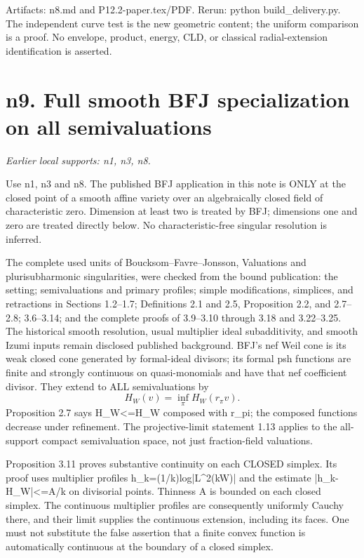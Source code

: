 \documentclass[11pt]{article}
\begin{document}
Artifacts: n8.md and P12.2-paper.tex/PDF. Rerun: python build\_delivery.py. The independent curve test is the new geometric content; the uniform comparison is a proof. No envelope, product, energy, CLD, or classical radial-extension identification is asserted.

\section{n9. Full smooth BFJ specialization on all semivaluations}
\textit{Earlier local supports: n1, n3, n8.}

Use n1, n3 and n8. The published BFJ application in this note is ONLY at the closed point of a smooth affine variety over an algebraically closed field of characteristic zero. Dimension at least two is treated by BFJ; dimensions one and zero are treated directly below. No characteristic-free singular resolution is inferred.

The complete used units of Boucksom--Favre--Jonsson, Valuations and plurisubharmonic singularities, were checked from the bound publication: the setting; semivaluations and primary profiles; simple modifications, simplices, and retractions in Sections 1.2--1.7; Definitions 2.1 and 2.5, Proposition 2.2, and 2.7--2.8; 3.6--3.14; and the complete proofs of 3.9--3.10 through 3.18 and 3.22--3.25. The historical smooth resolution, usual multiplier ideal subadditivity, and smooth Izumi inputs remain disclosed published background. BFJ's nef Weil cone is its weak closed cone generated by formal-ideal divisors; its formal psh functions are finite and strongly continuous on quasi-monomials and have that nef coefficient divisor. They extend to ALL semivaluations by
\[
H_W(v)=\inf_\pi H_W(r_\pi v).
\]
Proposition 2.7 says H\_W<=H\_W composed with r\_pi; the composed functions decrease under refinement. The projective-limit statement 1.13 applies to the all-support compact semivaluation space, not just fraction-field valuations.

Proposition 3.11 proves substantive continuity on each CLOSED simplex. Its proof uses multiplier profiles h\_k=(1/k)log|L\textasciicircum{}2(kW)| and the estimate |h\_k-H\_W|<=A/k on divisorial points. Thinness A is bounded on each closed simplex. The continuous multiplier profiles are consequently uniformly Cauchy there, and their limit supplies the continuous extension, including its faces. One must not substitute the false assertion that a finite convex function is automatically continuous at the boundary of a closed simplex.
\end{document}

